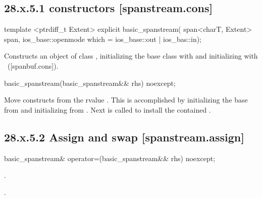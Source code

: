\documentclass[ebook,11pt,article]{memoir}
\renewcommand{\iref}[1]{[#1]}
\begin{document}
\subsection{28.x.5.1  constructors [spanstream.cons]}
\label{spanstream.cons}

\begin{itemdecl}
template <ptrdiff_t Extent>
explicit basic_spanstream(
  span<charT, Extent> span,
  ios_base::openmode which = ios_base::out | ios_bas::in);
\end{itemdecl}

\begin{itemdescr}
\pnum
\effects
Constructs an object of class
,
initializing the base class with
and initializing  with
~(\iref{spanbuf.cons}).
\end{itemdescr}

\begin{itemdecl}
basic_spanstream(basic_spanstream&& rhs) noexcept;
\end{itemdecl}

\begin{itemdescr}
\pnum
\effects Move constructs from the rvalue . 
This is accomplished by 
initializing the base  from  
and initializing  from .
Next  is called to
install the contained .
\end{itemdescr}

\subsection{28.x.5.2 Assign and swap [spanstream.assign]}
\label{spanstream.assign}

\begin{itemdecl}
basic_spanstream& operator=(basic_spanstream&& rhs) noexcept;
\end{itemdecl}

\begin{itemdescr}
\pnum
\effects 
{} .

\pnum
\returns {}.
\end{itemdescr}
\end{document}
